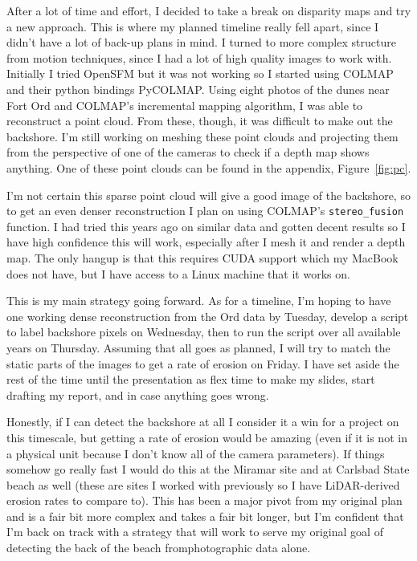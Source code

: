 \documentclass[a4paper, 11pt]{article}
\begin{document}
After a lot of time and effort, I decided to take a break on disparity maps and try a new approach.
This is where my planned timeline really fell apart, since I didn't have a lot of back-up plans in mind.
I turned to more complex structure from motion techniques, since I had a lot of high quality images to work with.
Initially I tried OpenSFM but it was not working so I started using COLMAP and their python bindings PyCOLMAP.
Using eight photos of the dunes near Fort Ord and COLMAP's incremental mapping algorithm, I was able to reconstruct a point cloud.
From these, though, it was difficult to make out the backshore.
I'm still working on meshing these point clouds and projecting them from the perspective of one of the cameras to check if a depth map shows anything.
One of these point clouds can be found in the appendix, Figure~\ref{fig:pc}.

I'm not certain this sparse point cloud will give a good image of the backshore, so to get an even denser reconstruction I plan on using COLMAP's \verb|stereo_fusion| function.
I had tried this years ago on similar data and gotten decent results so I have high confidence this will work, especially after I mesh it and render a depth map.
The only hangup is that this requires CUDA support which my MacBook does not have, but I have access to a Linux machine that it works on.

This is my main strategy going forward.
As for a timeline, I'm hoping to have one working dense reconstruction from the Ord data by Tuesday, develop a script to label backshore pixels on Wednesday, then to run the script over all available years on Thursday.
Assuming that all goes as planned, I will try to match the static parts of the images to get a rate of erosion on Friday.
I have set aside the rest of the time until the presentation as flex time to make my slides, start drafting my report, and in case anything goes wrong.

Honestly, if I can detect the backshore at all I consider it a win for a project on this timescale, but getting a rate of erosion would be amazing (even if it is not in a physical unit because I don't know all of the camera parameters).
If things somehow go really fast I would do this at the Miramar site and at Carlsbad State beach as well (these are sites I worked with previously so I have LiDAR-derived erosion rates to compare to).
This has been a major pivot from my original plan and is a fair bit more complex and takes a fair bit longer, but I'm confident that I'm back on track with a strategy that will work to serve my original goal of detecting the back of the beach fromphotographic data alone.
\end{document}
